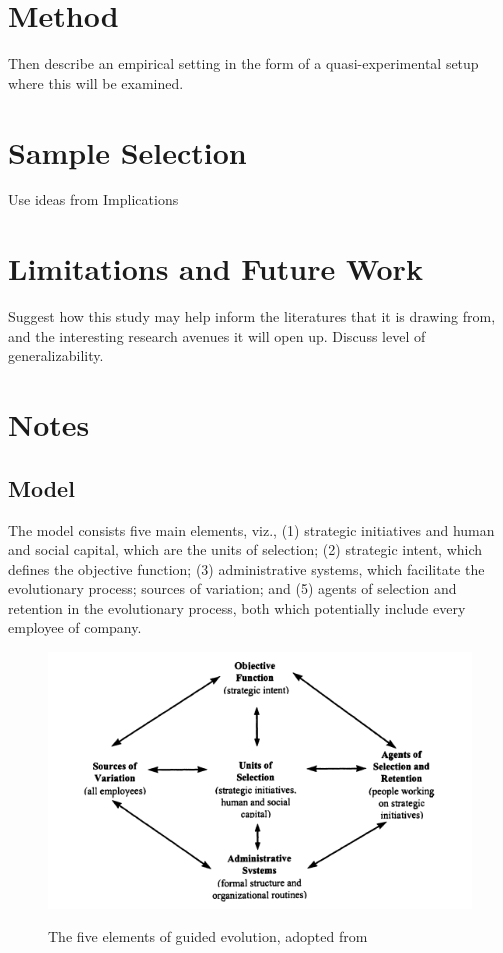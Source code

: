 \documentclass[12pt,letterpaper]{article}
\begin{document}
\section{Method}
Then describe an empirical setting in the form of a quasi-experimental setup where this will be examined.
\section{Sample Selection}
Use ideas from \cite{Burgelman1991} Implications

\section{Limitations and Future Work}
Suggest how this study may help inform the literatures that it is drawing from, and the interesting research avenues it will open up. Discuss level of generalizability.

\section{Notes}
\subsection{\cite{Lovas2000} Model}
The model consists five main elements, viz., (1) strategic initiatives and human and social capital, which are the units of selection; (2) strategic intent, which defines the objective function; (3) administrative systems, which facilitate the evolutionary process; sources of variation; and (5) agents of selection and retention in the evolutionary process, both which potentially include every employee of company.

\begin{figure}[h]
\begin{centering}
  \caption{The five elements of guided evolution, adopted from \cite{Lovas2000}}
  \includegraphics[width=\textwidth]{Lovas2000}
  \label{fig:Lovas2000}
\end{centering}
\end{figure}
\end{document}
